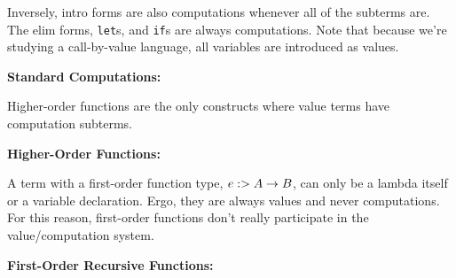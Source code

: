 \documentclass[]{article}
\begin{document}
\begin{abstrsyn}
Inversely, intro forms are also computations whenever all of the subterms are.
The elim forms, {\tt let}s, and {\tt if}s are always computations.
Note that because we're studying a call-by-value language, all variables are introduced as values.

\begin{framed}
\noindent\textbf{Standard Computations:}
\end{framed}

Higher-order functions are the only constructs where value terms have computation subterms.

\begin{framed}
\noindent\textbf{Higher-Order Functions:}
\end{framed}

A term with a first-order function type, $e :> A \to B$, can only be a lambda itself or a variable declaration.
Ergo, they are always values and never computations.
For this reason, first-order functions don't really participate in the value/computation system.

\begin{framed}
\noindent\textbf{First-Order Recursive Functions:}
\end{framed}



\end{abstrsyn}
\end{document}
